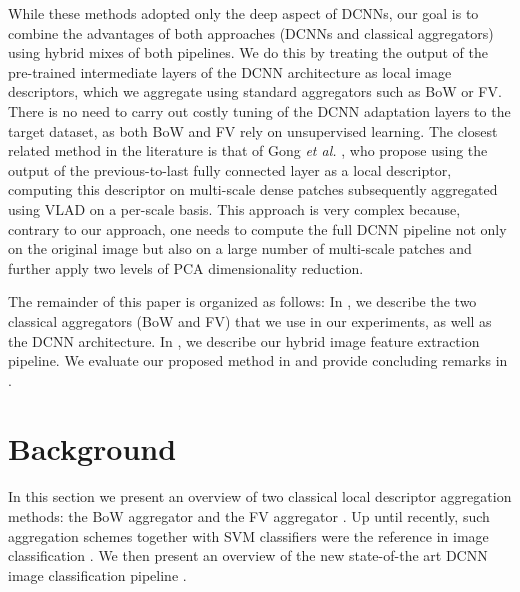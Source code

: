 \documentclass{article}
\begin{document}
While these methods adopted only the deep aspect of DCNNs, our goal is to combine the advantages of both approaches (DCNNs and classical aggregators) using hybrid mixes of both pipelines. We do this by treating the output of the pre-trained intermediate layers of the DCNN architecture as local image descriptors, which we aggregate using standard aggregators such as BoW or FV. There is no need to carry out costly tuning of the DCNN adaptation layers \cite{Oquaba} to the target dataset, as both BoW and FV rely on unsupervised learning. The closest related method in the literature is that of Gong \textit{et al.} \cite{gong2014multi}, who propose using the output of the previous-to-last fully connected layer as a local descriptor, computing this descriptor on multi-scale dense patches subsequently aggregated using VLAD on a per-scale basis. This approach is very complex because, contrary to our approach, one needs to compute the full DCNN pipeline not only on the original image but also on a large number of multi-scale patches and further apply two levels of PCA dimensionality reduction. 



The remainder of this paper is organized as follows: In , we describe the two classical aggregators (BoW and FV) that we use in our experiments, as well as the DCNN architecture. In , we describe our hybrid image feature extraction pipeline. We evaluate our proposed method in  and provide concluding remarks in .

\section{Background}\label{background}
In this section we present an overview of two classical local descriptor aggregation methods: the BoW aggregator \cite{Sivic2003,Lazebnika,Bosch} and the FV aggregator \cite{Perronnin2010}. Up until recently, such aggregation schemes together with SVM classifiers were the reference in image classification \cite{Chatfield2011}.  We then present an overview of the new state-of-the art DCNN image classification pipeline \cite{Krizhevsky2012}. %
\end{document}
